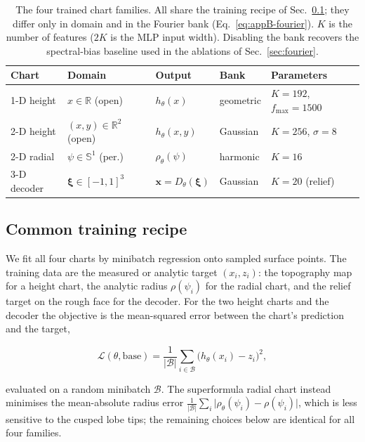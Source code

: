 \documentclass{svjour3}                 %
\newcommand{\R}{\mathbb{R}}
\newcommand{\Sph}{\mathbb{S}}
\newcommand{\abs}[1]{\lvert#1\rvert}
\newcommand{\xbf}{\bm{x}}
\begin{document}
\begin{appendix}
\begin{table}
\centering
\caption{The four trained chart families. All share the training recipe of
Sec.~\ref{app:training:recipe}; they differ only in domain and in the Fourier bank
(Eq.~\eqref{eq:appB-fourier}). $K$ is the number of features ($2K$ is the MLP input width). Disabling the
bank recovers the spectral-bias baseline used in the ablations of Sec.~\ref{sec:fourier}.}
\label{tab:appB-charts}
\small
\begin{tabular}{@{}lllll@{}}
\toprule
Chart & Domain & Output & Bank & Parameters \\
\midrule
1-D height  & $x\in\R$ (open)        & $h_\theta(x)$        & geometric & $K{=}192$, $f_{\max}{=}1500$ \\
2-D height  & $(x,y)\in\R^2$ (open)  & $h_\theta(x,y)$      & Gaussian  & $K{=}256$, $\sigma{=}8$ \\
2-D radial  & $\psi\in\Sph^1$ (per.) & $\rho_\theta(\psi)$  & harmonic  & $K{=}16$ \\
3-D decoder & $\bm\xi\in[-1,1]^3$    & $\xbf=D_\theta(\bm\xi)$ & Gaussian & $K{=}20$ (relief) \\
\bottomrule
\end{tabular}
\end{table}

\subsection{Common training recipe}\label{app:training:recipe}

We fit all four charts by minibatch regression onto sampled surface points. The training data are the measured or analytic target $(x_i,z_i)$: the topography map for a height chart, the analytic radius $\rho(\psi_i)$ for the radial chart, and the relief target on the rough face for the decoder. For the two height charts and the decoder the objective is the mean-squared error between the chart's prediction and the target,

\begin{equation}\label{eq:appB-mse}
\mathcal L(\theta,\mathrm{base})=\frac{1}{\abs{\mathcal B}}\sum_{i\in\mathcal B}
\big(h_\theta(x_i)-z_i\big)^2,
\end{equation}

evaluated on a random minibatch $\mathcal B$. The superformula radial chart instead minimises the mean-absolute radius error $\frac{1}{\abs{\mathcal B}}\sum_i\abs{\rho_\theta(\psi_i)-\rho(\psi_i)}$, which is less sensitive to the cusped lobe tips; the remaining choices below are identical for all four families.


\end{appendix}
\end{document}
